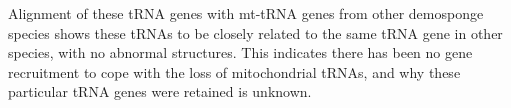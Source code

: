 \documentclass[../main.tex]{subfiles}
\begin{document}
Alignment of these tRNA genes with mt-tRNA genes from other demosponge species shows these tRNAs to be closely related to the same tRNA gene in other species, with no abnormal structures. This indicates there has been no gene recruitment to cope with the loss of mitochondrial tRNAs, and why these particular tRNA genes were retained is unknown.
\end{document}
